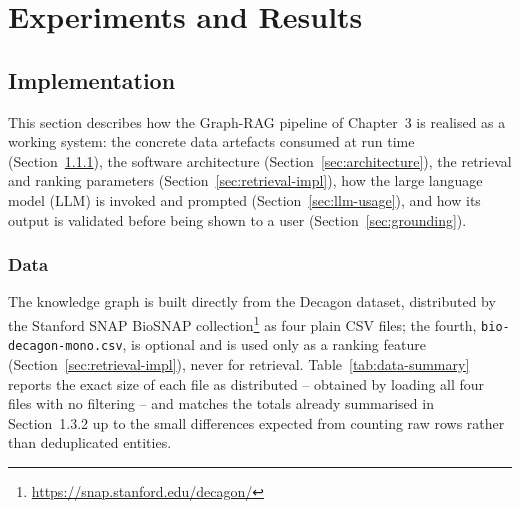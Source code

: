 %
%
%   
%

\chapter{Experiments and Results}
\label{chap:experiments}

\section{Implementation}
\label{sec:implementation}

This section describes how the Graph-RAG pipeline of Chapter~3 is realised
as a working system: the concrete data artefacts consumed at run time
(Section~\ref{sec:data}), the software architecture
(Section~\ref{sec:architecture}), the retrieval and ranking parameters
(Section~\ref{sec:retrieval-impl}), how the large language model (LLM) is
invoked and prompted (Section~\ref{sec:llm-usage}), and how its output is
validated before being shown to a user (Section~\ref{sec:grounding}).

\subsection{Data}
\label{sec:data}

The knowledge graph is built directly from the Decagon dataset, distributed
by the Stanford SNAP BioSNAP collection\footnote{\url{https://snap.stanford.edu/decagon/}}
as four plain CSV files; the fourth, \texttt{bio-decagon-mono.csv}, is
optional and is used only as a ranking feature (Section~\ref{sec:retrieval-impl}),
never for retrieval. Table~\ref{tab:data-summary} reports the exact size of
each file as distributed -- obtained by loading all four files with no
filtering -- and matches the totals already summarised in Section~1.3.2 up
to the small differences expected from counting raw rows rather than
deduplicated entities.

